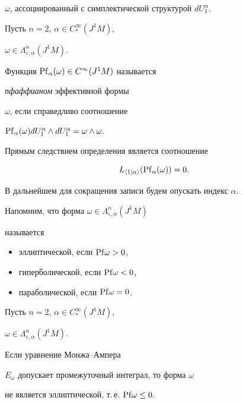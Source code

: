 $\omega$, ассоциированный с симплектической структурой $dU_1^\alpha $.





\begin{defn}


Пусть $n=2$, $\alpha \in C_{*}^\infty (J^1M)$, 


$\omega \in \Lambda_{\varepsilon ,\alpha }^n(J^1M)$.


Функция ${\operatorname{Pf}}_\alpha (\omega)\in C^\infty (J^1M)$ называется


{\em пфаффианом} эффективной формы 


$\omega $, если справедливо соотношение


${\Pf}_\alpha (\omega )dU_1^\alpha \wedge dU_1^\alpha =\omega


\wedge \omega.$


\end{defn}





Прямым следствием определения является соотношение


\begin{equation}


L_{\langle 1\mid \alpha\rangle}({\Pf}_\alpha (\omega ))=0. \label{star}


\end{equation}





В дальнейшем для сокращения записи будем опускать индекс $\alpha$.


Напомним, что форма $\omega \in \Lambda_{\varepsilon ,\alpha }^n(J^1M)$


называется





\begin{itemize}


\item[1.] эллиптической, если ${\operatorname{Pf}}\omega >0$,


\item[2.] гиперболической, если ${\operatorname{Pf}}\omega <0$,


\item[3.] параболической, если ${\operatorname{Pf}}\omega =0$.


\end{itemize}





\begin{prop}\label{integral1}


Пусть $n=2$, $\alpha \in C_{*}^\infty (J^1M)$,


$\omega \in\Lambda_{\varepsilon ,\alpha }^n(J^1M)$.


Если уравнение Монжа--Ампера 


$E_\omega$ допускает промежуточный интеграл, то форма $\omega$ 


не является эллиптической, т.\,е. ${\operatorname{Pf}}\omega \leq 0.$


\end{prop}





